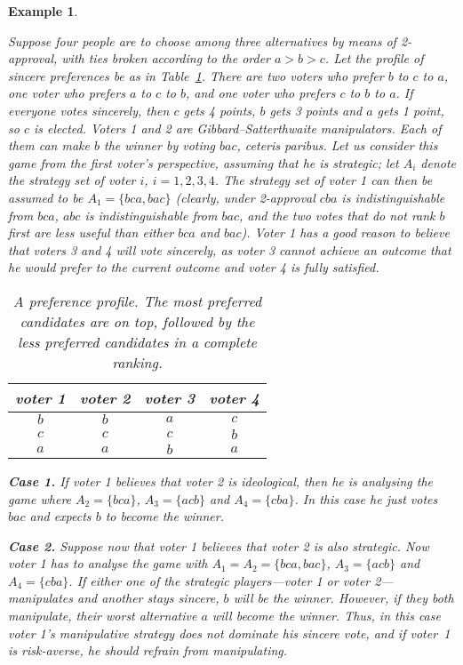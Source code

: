 \documentclass[11pt]{article}
\newtheorem{example}{Example}
\begin{document}
\begin{example}\label{ex1}
{\em
Suppose four people are to choose among three alternatives by means of 2-approval,
with ties broken according to the order $a>b>c$.
Let the profile of sincere preferences be as in Table~\ref{table:ex1}.
There are two voters who prefer $b$ to $c$ to $a$, one voter who prefers $a$ to $c$ to $b$,
and one voter who prefers $c$ to $b$ to $a$.
If everyone votes sincerely, then $c$ gets 4 points,
$b$ gets 3 points and $a$ gets 1 point, so $c$ is elected. %
Voters 1 and 2 are Gibbard--Satterthwaite manipulators. Each of them  can make $b$ the winner by voting $bac$,
ceteris paribus.  Let us consider this game from the first voter's perspective, 
assuming that he is strategic; let $A_i$ denote the strategy set of voter $i$, $i=1, 2, 3, 4$. 
The strategy set of voter 1 can then be assumed to be $A_1=\{bca, bac\}$
(clearly, under 2-approval $cba$ is indistinguishable from $bca$, $abc$ is indistinguishable from $bac$, 
and the two votes that do not rank $b$ first are less useful than either $bca$ and $bac$).
Voter 1 has a good reason to believe that voters 3 and 4 will vote sincerely, 
as voter 3 cannot achieve an outcome that he would prefer to the current outcome and voter 4 is fully satisfied.

\begin{table}[h]
\begin{center}
\begin{tabular}{cccc}
voter 1&voter 2&voter 3&voter 4\\
\midrule
$b$&$b$&$a$&$c$\\
$c$&$c$&$c$&$b$\\
$a$&$a$&$b$&$a$\\
\end{tabular}
\caption{A preference profile. The most preferred candidates are on top, followed by the less preferred candidates in a complete ranking.
}\label{table:ex1}
\end{center}
\end{table}


{\bf Case 1.} 
If voter 1 believes that voter 2 is ideological, then he is analysing the game where $A_2=\{bca\}$, $A_3=\{acb\}$ 
and $A_4=\{cba\}$. In this case he just votes $bac$ and expects $b$ to become the winner. %

{\bf Case 2.} 
Suppose now that voter 1 believes that voter 2 is also strategic. Now voter 1 has to analyse the game with 
$A_1=A_2=\{bca, bac\}$, $A_3=\{acb\}$ and $A_4=\{cba\}$. If either one of the strategic players---voter 1 or voter 
2---manipulates and another stays sincere, $b$ will be the winner. However, if they both manipulate, their worst 
alternative $a$ will become the winner.  
Thus, in this case voter 1's manipulative strategy does not dominate his sincere vote, 
and if voter~1 is risk-averse, he should refrain from manipulating.
}
\end{example}
\end{document}

